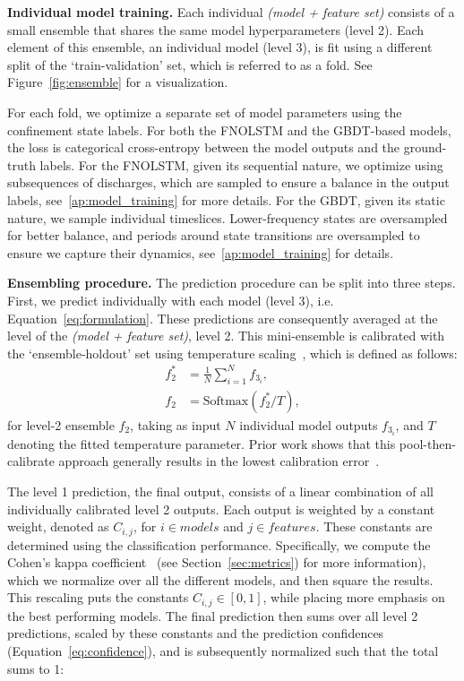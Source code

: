 \textbf{Individual model training.}
Each individual \textit{(model + feature set)} consists of a small ensemble that shares the same model hyperparameters (level 2). Each element of this ensemble, an individual model (level 3), is fit using a different split of the `train-validation' set, which is referred to as a fold. See Figure~\ref{fig:ensemble} for a visualization.

For each fold, we optimize a separate set of model parameters using the confinement state labels. For both the FNOLSTM and the GBDT-based models, the loss is categorical cross-entropy between the model outputs and the ground-truth labels. For the FNOLSTM, given its sequential nature, we optimize using subsequences of discharges, which are sampled to ensure a balance in the output labels, see~\ref{ap:model_training} for more details. For the GBDT, given its static nature, we sample individual timeslices. Lower-frequency states are oversampled for better balance, and periods around state transitions are oversampled to ensure we capture their dynamics, see~\ref{ap:model_training} for details.

\textbf{Ensembling procedure.}
The prediction procedure can be split into three steps. First, we predict individually with each model (level 3), i.e. Equation~\ref{eq:formulation}. These predictions are consequently averaged at the level of the \textit{(model + feature set)}, level 2. This mini-ensemble is calibrated with the `ensemble-holdout' set using temperature scaling~\cite{guo2017}, which is defined as follows:
\begin{align}
f_{2}^* &= \frac{1}{N} \sum_{i=1}^{N} f_{3_i}, \\
f_2 &= \text{Softmax}(f^{*}_{2}/T),
\end{align}
for level-2 ensemble $f_2$, taking as input $N$ individual model outputs $f_{3_i}$, and $T$ denoting the fitted temperature parameter. Prior work shows that this pool-then-calibrate approach generally results in the lowest calibration error~\cite{rahaman2021uncertainty}. 

The level 1 prediction, the final output, consists of a linear combination of all individually calibrated level 2 outputs. Each output is weighted by a constant weight, denoted as $C_{i,j}$, for $i \in models$ and $j \in features$. These constants are determined using the classification performance. Specifically, we compute the Cohen's kappa coefficient~\cite{cohen1960} (see Section~\ref{sec:metrics}) for more information), which we normalize over all the different models, and then square the results. This rescaling puts the constants $C_{i,j} \in [0, 1]$, while placing more emphasis on the best performing models. The final prediction then sums over all level 2 predictions, scaled by these constants and the prediction confidences (Equation~\ref{eq:confidence}), and is subsequently normalized such that the total sums to 1:

